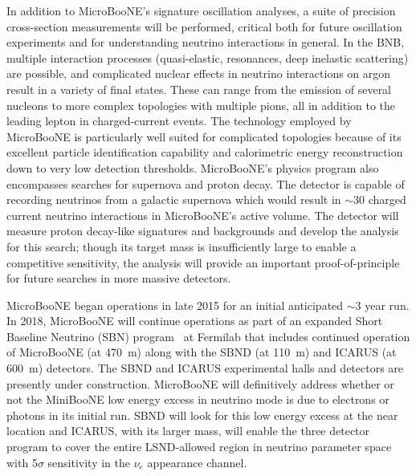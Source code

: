 
In addition to MicroBooNE's signature oscillation analyses, a suite of precision cross-section measurements will be performed, critical both for future \lartpc oscillation experiments and for understanding neutrino interactions in general.   In the BNB, multiple interaction processes (quasi-elastic, resonances, deep inelastic scattering) are possible, and complicated nuclear effects in neutrino interactions on argon result in a variety of final states. These can range from the emission of several nucleons to more complex topologies with multiple pions, all in addition to the leading lepton in charged-current events. The \lartpc technology employed by MicroBooNE is particularly well suited for complicated topologies because of its excellent particle identification capability and calorimetric energy reconstruction down to very low detection thresholds. MicroBooNE's physics program also encompasses searches for supernova and proton decay.  The detector is capable of recording neutrinos from a galactic supernova which would result in $\sim$30 charged current neutrino interactions in MicroBooNE's active volume.   The detector will measure proton decay-like signatures and backgrounds and develop the analysis for this search; though its target mass is insufficiently large to enable a competitive sensitivity, the analysis will provide an important proof-of-principle for future searches in more massive detectors.  


MicroBooNE began operations in late 2015 for an initial anticipated $\sim$3 year run.   In 2018, MicroBooNE will continue operations as part of an expanded Short Baseline Neutrino (SBN) program~\cite{Adams:2013-lar1nd} at Fermilab that includes continued operation of MicroBooNE (at 470~m) along with the SBND (at 110~m)  and ICARUS (at 600~m) detectors.  The SBND and ICARUS experimental halls and detectors are presently under construction.  MicroBooNE will definitively address whether or not the MiniBooNE low energy excess in neutrino mode is due to electrons or photons in its initial run.  SBND will look for this low energy excess at the near location and ICARUS, with its larger mass, will enable the three detector program to cover the entire LSND-allowed region in neutrino parameter space with 5$\sigma$ sensitivity in the $\nu_e$ appearance channel.


